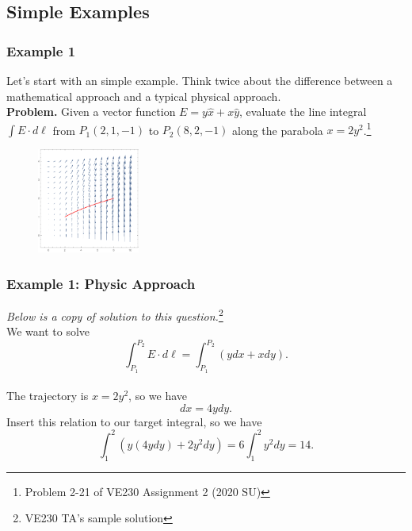 \documentclass[11pt, t]{beamer}
\newcommand{\nullspace}{~\\[15pt]}
\begin{document}
\subsection{Simple Examples}
\begin{frame}
    \frametitle{Example 1}
    Let's start with an simple example. Think twice about the difference between a mathematical approach and a typical physical approach. \nullspace
    \textbf{Problem.} Given a vector function $E=y\hat x+x\hat y$, evaluate the line integral $\int E\cdot d\ell$ from $P_1(2,1,-1)$ to $P_2(8,2,-1)$ along the parabola $x=2y^2$.\footnote[frame]{Problem 2-21 of VE230 Assignment 2 (2020 SU)}
    \begin{figure}[H]
        \centering
        \includegraphics[width=0.3\textwidth]{e1.pdf}
        \label{fig:}
    \end{figure}
\end{frame}



\begin{frame}
    \frametitle{Example 1: Physic Approach}
    \textit{Below is a copy of solution to this question.}\footnote[frame]{VE230 TA's sample solution}\nullspace
    We want to solve $$\int_{P_1}^{P_2}E\cdot d\ell=\int_{P_1}^{P_2}(ydx+xdy).$$\\
    The trajectory is $x=2y^2$, so we have
    \begin{equation}\label{eq:subst}
        dx=4ydy.
    \end{equation}
    Insert this relation to our target integral, so we have $$\int_{1}^{2}(y(4ydy)+2y^2dy)=6\int_{1}^{2}y^2dy=14.$$
\end{frame}
\end{document}
